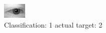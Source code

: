 \begin{figure}[h!]
\begin{center}
\includegraphics[width=0.60\columnwidth]{figures/ID353_class_1_target_2.png}
\end{center}
\caption{ Classification: 1 actual target: 2}
\label{fig:ID353_class_1_target_2}
\end{figure}
